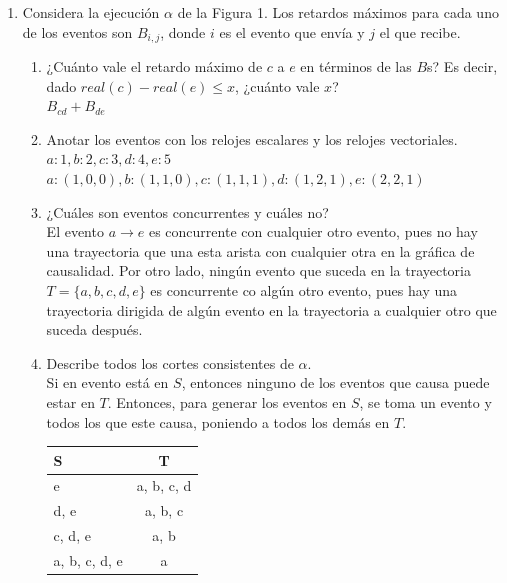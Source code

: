 \documentclass[12pt,a4paper]{report}
\begin{document}
\begin{enumerate}
	\item {
		Considera la ejecución $\alpha$ de la Figura 1. Los retardos máximos
		para cada uno de los eventos son $B_{i, j}$, donde $i$ es el evento
		que envía y $j$ el que recibe.
		\begin{enumerate}
			\item {
				¿Cuánto vale el retardo máximo de $c$ a $e$ en términos de
				las $B$s? Es decir, dado $real(c)-real(e) \leq x$, ¿cuánto
				vale $x$?\\
				$B_{cd} + B_{de}$
			}

			\item {
				Anotar los eventos con los relojes escalares y los relojes
				vectoriales.\\
				$a:1, b:2, c:3, d:4, e:5$\\
				$a:(1, 0, 0), b:(1, 1, 0), c:(1, 1, 1), d:(1, 2, 1), e:(2, 2,
                1)$
			}

			\item {
				¿Cuáles son eventos concurrentes y cuáles no?\\
				El evento $a\rightarrow e $ es concurrente con cualquier otro
                evento, pues no hay una trayectoria que una esta arista con
                cualquier otra en la gráfica de causalidad. Por otro lado,
                ningún evento que suceda en la trayectoria $T=\{a,b,c,d,e\}$ es
                concurrente co algún otro evento, pues hay una trayectoria
                dirigida de algún evento en la trayectoria a cualquier otro que
                suceda después.
			}

			\item {
				Describe todos los cortes consistentes de $\alpha$.\\
				Si en evento está en $S$, entonces ninguno de los eventos
				que causa puede estar en $T$. Entonces, para generar los
				eventos en $S$, se toma un evento y todos los que este causa,
				poniendo a todos los demás en $T$.\\
				\begin{tabular}{| l | c |}
					\hline
						S & T \\ \hline
						e & a, b, c, d \\ \hline
						d, e & a, b, c \\ \hline
					    c, d, e & a, b \\ \hline
					    a, b, c, d, e & a \\
					\hline
				\end{tabular}
			}
		\end{enumerate}
	}


\end{enumerate}
\end{document}
